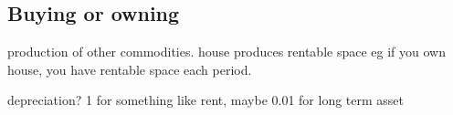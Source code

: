 
\subsection{Buying or owning}

production of other commodities. house produces rentable space
eg if you own house, you have rentable space each period.


depreciation? 1 for something like rent, maybe 0.01 for long term asset


